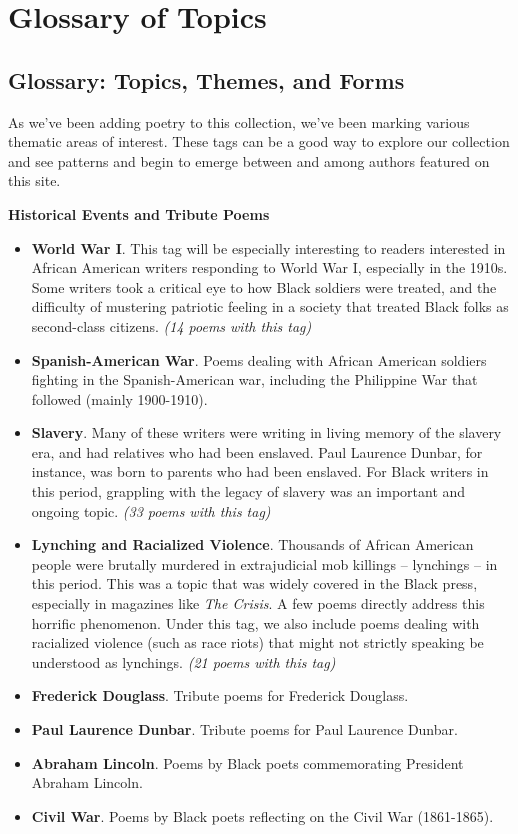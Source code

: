 \documentclass[
  letterpaper,
  DIV=11,
  numbers=noendperiod]{scrartcl}
\providecommand{\tightlist}{%
  \setlength{\itemsep}{0pt}\setlength{\parskip}{0pt}}\usepackage{longtable,booktabs,array}
\begin{document}
\section{Glossary of Topics}

\subsection{Glossary: Topics, Themes, and
Forms}\label{glossary-topics-themes-and-forms}

As we've been adding poetry to this collection, we've been marking
various thematic areas of interest. These tags can be a good way to
explore our collection and see patterns and begin to emerge between and
among authors featured on this site.

\textbf{Historical Events and Tribute Poems}

\begin{itemize}
\tightlist
\item
  \textbf{World War I}. This tag will be especially interesting to
  readers interested in African American writers responding to World War
  I, especially in the 1910s. Some writers took a critical eye to how
  Black soldiers were treated, and the difficulty of mustering patriotic
  feeling in a society that treated Black folks as second-class
  citizens. \emph{(14 poems with this tag)}
\item
  \textbf{Spanish-American War}. Poems dealing with African American
  soldiers fighting in the Spanish-American war, including the
  Philippine War that followed (mainly 1900-1910).\\
\item
  \textbf{Slavery}. Many of these writers were writing in living memory
  of the slavery era, and had relatives who had been enslaved. Paul
  Laurence Dunbar, for instance, was born to parents who had been
  enslaved. For Black writers in this period, grappling with the legacy
  of slavery was an important and ongoing topic. \emph{(33 poems with
  this tag)}
\item
  \textbf{Lynching and Racialized Violence}. Thousands of African
  American people were brutally murdered in extrajudicial mob killings
  -- lynchings -- in this period. This was a topic that was widely
  covered in the Black press, especially in magazines like \emph{The
  Crisis}. A few poems directly address this horrific phenomenon. Under
  this tag, we also include poems dealing with racialized violence (such
  as race riots) that might not strictly speaking be understood as
  lynchings. \emph{(21 poems with this tag)}
\item
  \textbf{Frederick Douglass}. Tribute poems for Frederick Douglass.
\item
  \textbf{Paul Laurence Dunbar}. Tribute poems for Paul Laurence Dunbar.
\item
  \textbf{Abraham Lincoln}. Poems by Black poets commemorating President
  Abraham Lincoln.
\item
  \textbf{Civil War}. Poems by Black poets reflecting on the Civil War
  (1861-1865).
\end{itemize}
\end{document}
